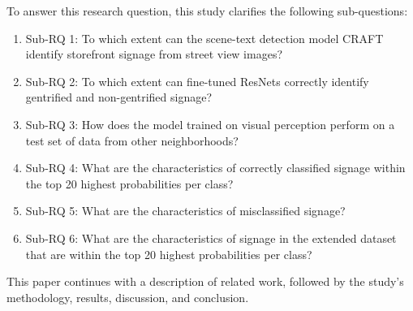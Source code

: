 To answer this research question, this study clarifies the following sub-questions: 

\begin{enumerate}
    \item Sub-RQ 1: To which extent can the scene-text detection model CRAFT identify storefront signage from street view images?
    \item Sub-RQ 2: To which extent can fine-tuned ResNets correctly identify gentrified and non-gentrified signage?
    \item Sub-RQ 3: How does the model trained on visual perception perform on a test set of data from other neighborhoods?
    \item Sub-RQ 4: What are the characteristics of correctly classified signage within the top 20 highest probabilities per class?
    \item Sub-RQ 5: What are the characteristics of misclassified signage?
    \item Sub-RQ 6: What are the characteristics of signage in the extended dataset that are within the top 20 highest probabilities per class?
\end{enumerate}

This paper continues with a description of related work, followed by the study's methodology, results, discussion, and conclusion.